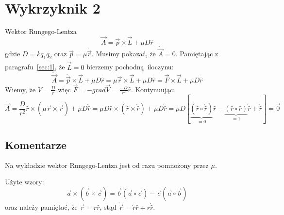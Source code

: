 \documentclass[a4paper,12pt]{article}
\begin{document}
\section{Wykrzyknik 2}
Wektor Rungego-Lentza
\[
  \vec{A} = \vec{p} \times \vec{L} + \mu D \hat{r}
\]
gdzie $D = kq_1q_2$ oraz $\vec{p} = \mu \dot{\vec{r}}$.
Musimy pokazać, że $\dot{\vec{A}} = 0$. Pamiętając z paragrafu~\ref{sec:1}, że
$\dot{\vec{L}} = 0$ bierzemy pochodną iloczynu:
\[
  \dot{\vec{A}} = \dot{\vec{p}} \times \vec{L} + \mu D \dot{\hat{r}} = \mu
  \ddot{\vec{r}} \times \vec{L} + \mu D \dot{\hat{r}} = \vec{F} \times \vec{L} +
  \mu D \dot{\hat{r}}
\]
Wiemy, że $V = \frac{D}{r}$ więc $\vec{F} = -grad\vec{V} =
\frac{-D}{r^2}\hat{r}$. Kontynuując:
\[
  \dot{\vec{A}} = \frac{D}{r^2}\hat{r} \times \left( \mu \vec{r} \times
  \dot{\vec{r}} \right) + \mu D \dot{\hat{r}} = \mu D\hat{r} \times \left(
  \hat{r} \times
  \dot{\hat{r}} \right) + \mu D \dot{\hat{r}} = \mu D \left[\underbrace{\left( \hat{r} \circ
    \dot{\hat{r}} \right)}_{=0} \hat{r} - \underbrace{\left( \hat{r} \circ \hat{r}
  \right)}_{=1}
\dot{\hat{r}} + \dot{\hat{r}} \right] = \vec{0}
\]

\subsection{Komentarze}
Na wykładzie wektor Rungego-Lentza jest od razu pomnożony przez $\mu$.

Użyte wzory:
\[
		\vec{a}\times(\vec{b}\times\vec{c}) = \vec{b} (\vec{a}\circ\vec{c}) -
    \vec{c}(\vec{a}\circ\vec{b})
\]
oraz należy pamiętać, że $\vec{r} = r\hat{r}$, stąd $\dot{\vec{r}} =
\dot{r}\hat{r} + r\dot{\hat{r}}$.
\end{document}
